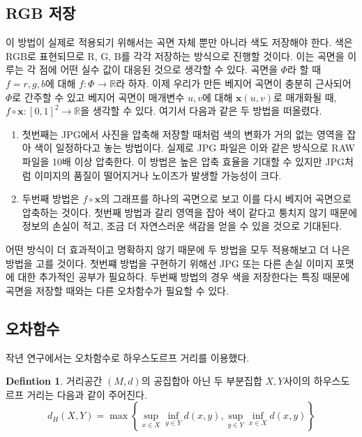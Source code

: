 \documentclass[10pt]{gshs-report-v2.0}
\theoremstyle{theorem}
\theoremstyle{lemma}
\theoremstyle{definition}
\newtheorem{definition}[theorem]{Defintion}
\begin{document}
\subsection{RGB 저장}
이 방법이 실제로 적용되기 위해서는 곡면 자체 뿐만 아니라 색도 저장해야 한다. 색은 RGB로 표현되므로 R, G, B를 각각 저장하는 방식으로 진행할 것이다. 이는 곡면을 이루는 각 점에 어떤 실수 값이 대응된 것으로 생각할 수 있다. 곡면을 $\Phi$라 할 때 $f=r, g, b$에 대해 $f:\Phi\rightarrow\mathbb{R}$라 하자. 이제 우리가 만든 베지어 곡면이 충분히 근사되어 $\Phi$로 간주할 수 있고 베지어 곡면이 매개변수 $u, v$에 대해 $\mathbf{x}(u, v)$로 매개화될 때, $f\circ\mathbf{x}:[0, 1]^2\rightarrow\mathbb{R}$을 생각할 수 있다. 여기서 다음과 같은 두 방법을 떠올렸다.
\begin{enumerate}
	\item 첫번째는 JPG에서 사진을 압축해 저장할 때처럼 색의 변화가 거의 없는 영역을 잡아 색이 일정하다고 놓는 방법이다. 실제로 JPG 파일은 이와 같은 방식으로 RAW 파일을 10배 이상 압축한다. 이 방법은 높은 압축 효율을 기대할 수 있지만 JPG처럼 이미지의 품질이 떨어지거나 노이즈가 발생할 가능성이 크다. 
	
	\item 두번째 방법은 $f\circ\mathbf{x}$의 그래프를 하나의 곡면으로 보고 이를 다시 베지어 곡면으로 압축하는 것이다. 첫번째 방법과 갈리 영역을 잡아 색이 같다고 퉁치지 않기 때문에 정보의 손실이 적고, 조금 더 자연스러운 색감을 얻을 수 있을 것으로 기대된다.
\end{enumerate}

어떤 방식이 더 효과적이고 명확하지 않기 때문에 두 방법을 모두 적용해보고 더 나은 방법을 고를 것이다. 첫번쨰 방법을 구현하기 위해선 JPG 또는 다른 손실 이미지 포맷에 대한 추가적인 공부가 필요하다. 두번째 방법의 경우 색을 저장한다는 특징 때문에 곡면을 저장할 때와는 다른 오차함수가 필요할 수 있다. 

\subsection{오차함수}
작년 연구에서는 오차함수로 하우스도르프 거리를 이용했다.
\begin{definition}
	거리공간 $(M, d)$의 공집합아 아닌 두 부분집합 $X, Y$사이의 하우스도르프 거리는 다음과 같이 주어진다.\cite{Munkres}
	\begin{equation} \label{Hausdorff}
		d_H(X, Y)=\max\left\{\sup_{x\in X}\inf_{y\in Y} d(x, y), \sup_{y\in Y}\inf_{x\in X} d(x, y)\right\}
	\end{equation}
\end{definition}
\end{document}
